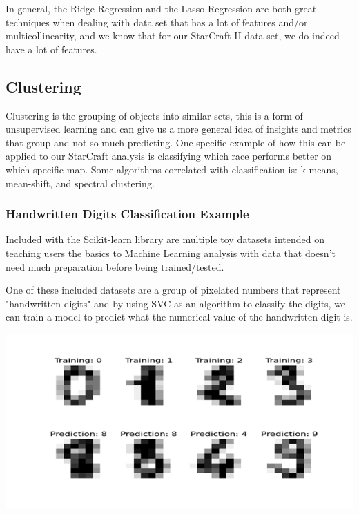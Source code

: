 \documentclass[a4paper,12pt]{report}
\begin{document}
In general, the Ridge Regression and the Lasso Regression are both great techniques when dealing with data set that has a lot of features and/or multicollinearity, and we know that for our StarCraft II data set, we do indeed have a lot of features.

\subsection{Clustering}
Clustering is the grouping of objects into similar sets, this is a form of unsupervised learning and can give us a more general idea of insights and metrics that group and not so much predicting. One specific example of how this can be applied to our StarCraft analysis is classifying which race performs better on which specific map. Some algorithms correlated with classification is: k-means, mean-shift, and spectral clustering.

\subsubsection{Handwritten Digits Classification Example}

Included with the Scikit-learn library are multiple toy datasets intended on teaching users the basics to Machine Learning analysis with data that doesn’t need much preparation before being trained/tested.

One of these included datasets are a group of pixelated numbers that represent "handwritten digits" and by using SVC as an algorithm to classify the digits, we can train a model to predict what the numerical value of the handwritten digit is.

\begin{center}
    \captionsetup{type=figure}
    \includegraphics[width=.9\linewidth]{media/digit.png}
\end{center}
\end{document}
